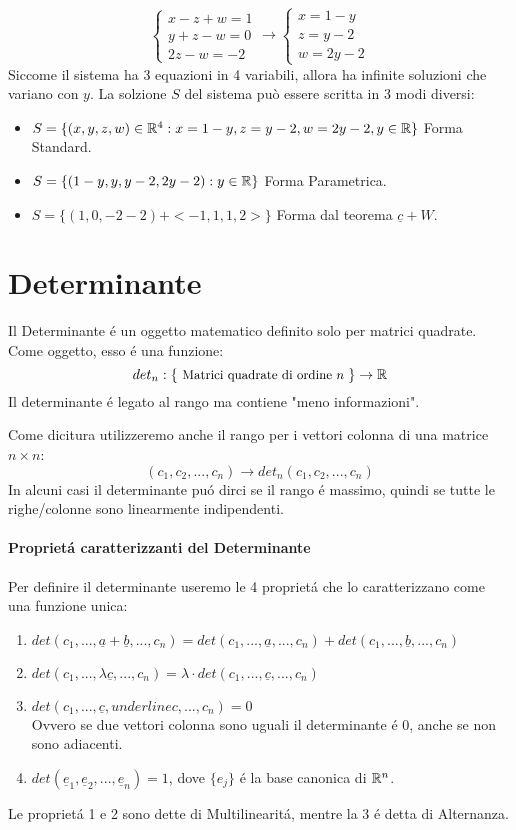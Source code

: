 {\begin{enumerate}
\[\begin{cases}
				      x-z+w=1 \\
				      y+z-w=0 \\
				      2z-w = -2
			      \end{cases}
			      \to
			      \begin{cases}
				      x=1-y \\
				      z=y-2 \\
				      w = 2y-2
			      \end{cases}
		      \]
		      Siccome il sistema ha 3 equazioni in 4 variabili, allora ha infinite soluzioni che variano con $y$.
		      La solzione $S$ del sistema può essere scritta in 3 modi diversi:
		      \begin{itemize}
			      \item $S=\{(x,y,z,w)\in \mathbb{R}^4 : x=1-y,z=y-2,w=2y-2, y\in \mathbb{R} \}$ Forma Standard.
			      \item $S=\{(1-y,y,y-2,2y-2):y\in\mathbb{R}\}$ Forma Parametrica.
			      \item $S=\{(1,0,-2-2)+<-1,1,1,2>\}$ Forma dal teorema $\underline{c} + W$.
		      \end{itemize}
	\end{enumerate}
}

\section{Determinante}
Il Determinante é un oggetto matematico definito solo per matrici quadrate.
Come oggetto, esso é una funzione:
\[
	det_n : \{\text{ \small{Matrici quadrate di ordine $n$} }	\} \to \mathbb{R}
\]
Il determinante é legato al rango ma contiene "meno informazioni".

Come dicitura utilizzeremo anche il rango per i vettori colonna di una matrice $n\times n$:
\[ (c_1,c_2, ... ,c_n) \to det_n(c_1,c_2,...,c_n)\]
In alcuni casi il determinante puó dirci se il rango é massimo, quindi se tutte le righe/colonne sono linearmente indipendenti.

\paragraph{Proprietá caratterizzanti del Determinante}
Per definire il determinante useremo le 4 proprietá che lo caratterizzano come una funzione unica:
\begin{enumerate}
	\item $det(c_1,...,\underline{a}+ \underline{b},...,c_n) = det(c_1,...,\underline{a},...,c_n) + det(c_1,...,\underline{b},...,c_n)$
	\item $det(c_1,...,\lambda \underline{c},...,c_n) = \lambda \cdot det(c_1,...,\underline{c},...,c_n)$
	\item $det(c_1,...,\underline{c}, underline{c},...,c_n) = 0$ \\
	      Ovvero se due vettori colonna sono uguali il determinante é 0, anche se non sono adiacenti.
	\item $det(\underline{e}_1, \underline{e}_2,...,\underline{e}_n) = 1$, dove $\{e_j\}$ é la base canonica di $\mathbb{R}^n$.

\end{enumerate}
Le proprietá 1 e 2 sono dette di Multilinearitá, mentre la 3 é detta di Alternanza.

